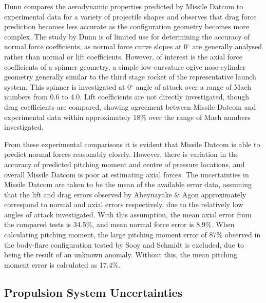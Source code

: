 Dunn\cite{Dunn1989} compares the aerodynamic properties predicted by Missile Datcom to experimental data for a variety of projectile shapes and observes that drag force prediction becomes less accurate as the configuration geometry becomes more complex\cite{Dunn1989}. The study by Dunn\cite{Dunn1989} is of limited use for determining the accuracy of normal force coefficients, as normal force curve slopes at 0$^\circ$ are generally analysed rather than normal or lift coefficients. However, of interest is the axial force coefficients of a spinner geometry, a simple low-curvature ogive nose-cylinder geometry generally similar to the third stage rocket of the representative launch system. This spinner is investigated at 0$^\circ$ angle of attack over a range of Mach numbers from 0.6 to 4.0. Lift coefficients are not directly investigated, though drag coefficients are compared, showing agreement between Missile Datcom and experimental data within approximately 18\% over the range of Mach numbers investigated. 

From these experimental comparisons it is evident that Missile Datcom is able to predict normal forces reasonably closely. However, there is variation in the accuracy of predicted pitching moment and centre of pressure locations, and overall Missile Datcom is poor at estimating axial forces. The uncertainties in Missile Datcom are taken to be the mean of the available error data, assuming that the lift and drag errors observed by Abeynayake \& Agon approximately correspond to normal and axial errors respectively, due to the relatively low angles of attack investigated. With this assumption, the mean axial error from the compared tests is 34.5\%, and mean normal force error is 8.9\%. When calculating pitching moment, the large pitching moment error of 87\% observed in the body-flare configuration tested by Sooy and Schmidt\cite{Sooy2005} is excluded, due to being the result of an unknown anomaly. Without this, the mean pitching moment error is calculated as 17.4\%.



\subsection{Propulsion System Uncertainties}




